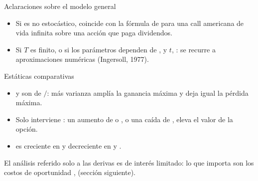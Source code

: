 \begin{frame}{Aclaraciones sobre el modelo general}
  \begin{itemize}
    \item Si  es no estocástico,  coincide con la fórmula de
           para una call americana de vida
          infinita sobre una acción que paga dividendos.
    \item Si $T$ es finito, o si los parámetros dependen de , 
          y $t$, : se recurre a
          aproximaciones numéricas (Ingersoll, 1977).
  \end{itemize}
\end{frame}

\begin{frame}{Estáticas comparativas}
  \begin{itemize}
    \item {} y  son  de
          $/$: más varianza amplía la ganancia máxima y deja
          igual la pérdida máxima.
    \item Solo interviene : un aumento de  o
          , o una caída de , eleva el valor
          de la opción.
    \item {} es creciente en  y decreciente en
           y \az{$\mu$}.
  \end{itemize}
  \begin{cajatexto}
    El análisis referido solo a las derivas es de interés limitado: lo que
    importa son los costos de oportunidad , 
    (sección siguiente).
  \end{cajatexto}
\end{frame}
